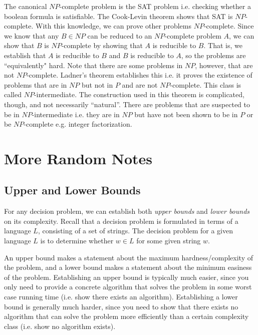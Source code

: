 \documentclass[10pt,a4paper]{article}
\begin{document}
The canonical $NP$-complete problem is the SAT problem i.e. checking whether a boolean formula is satisfiable. The Cook-Levin theorem shows that SAT is $NP$-complete. With this knowledge, we can prove other problems $NP$-complete. Since we know that any $B \in NP$ can be reduced to an $NP$-complete problem $A$, we can show that $B$ is $NP$-complete by showing that $A$ is reducible to $B$. That is, we establish that $A$ is reducible to $B$ and $B$ is reducible to $A$, so the problems are ``equivalently" hard. Note that there are some problems in $NP$, however, that are not $NP$-complete. Ladner's theorem establishes this i.e. it proves the existence of problems that are in $NP$ but not in $P$ and are not $NP$-complete. This class is called $NP$-intermediate. The construction used in this theorem is complicated, though, and not necessarily ``natural''. There are problems that are suspected to be in $NP$-intermediate i.e. they are in $NP$ but have not been shown to be in $P$ or be $NP$-complete e.g. integer factorization.

\section{More Random Notes}

\subsection{Upper and Lower Bounds}
For any decision problem, we can establish both \textit{upper bounds} and \textit{lower bounds} on its complexity. Recall that a decision problem is formulated in terms of a language $L$, consisting of a set of strings. The decision problem for a given language $L$ is to determine whether $w \in L$ for some given string $w$.

An upper bound makes a statement about the maximum hardness/complexity of the problem, and a lower bound makes a statement about the minimum easiness of the problem. Establishing an upper bound is typically much easier, since you only need to provide a concrete algorithm that solves the problem in some worst case running time (i.e. show there exists an algorithm). Establishing a lower bound is generally much harder, since you need to show that there exists no algorithm that can solve the problem more efficiently than a certain complexity class (i.e. show no algorithm exists). 
\end{document}
